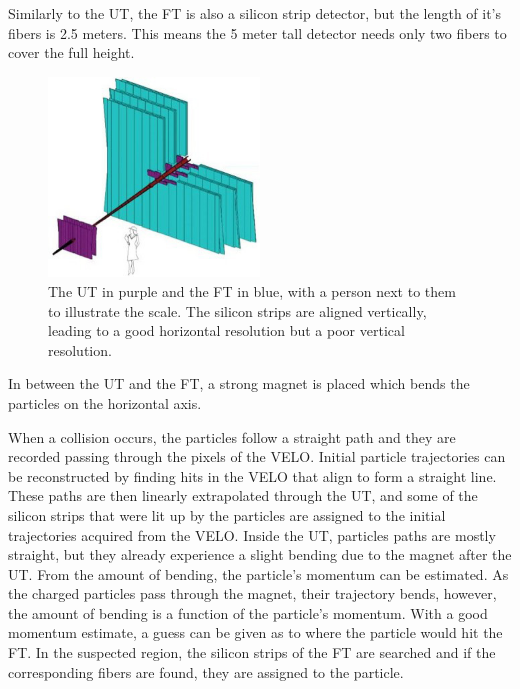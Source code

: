 \documentclass[12pt]{article}
\begin{document}
Similarly to the UT, the FT is also a silicon strip detector, but the length of it's fibers is 2.5 meters. This means the 5 meter tall detector needs only two fibers to cover the full height.

\begin{figure}[H]
	\begin{center}
		\includegraphics[width=0.5\textwidth]{detector_ut_ft_drawing}
	\end{center}
	\caption{The UT in purple and the FT in blue, with a person next to them to illustrate the scale. The silicon strips are aligned vertically, leading to a good horizontal resolution but a poor vertical resolution.}
	\label{fig_detector_ut_ft_drawing}
\end{figure}

In between the UT and the FT, a strong magnet is placed which bends the particles on the horizontal axis.

When a collision occurs, the particles follow a straight path and they are recorded passing through the pixels of the VELO. Initial particle trajectories can be reconstructed by finding hits in the VELO that align to form a straight line. These paths are then linearly extrapolated through the UT, and some of the silicon strips that were lit up by the particles are assigned to the initial trajectories acquired from the VELO. Inside the UT, particles paths are mostly straight, but they already experience a slight bending due to the magnet after the UT. From the amount of bending, the particle's momentum can be estimated. As the charged particles pass through the magnet, their trajectory bends, however, the amount of bending is a function of the particle's momentum. With a good momentum estimate, a guess can be given as to where the particle would hit the FT. In the suspected region, the silicon strips of the FT are searched and if the corresponding fibers are found, they are assigned to the particle.
\end{document}
